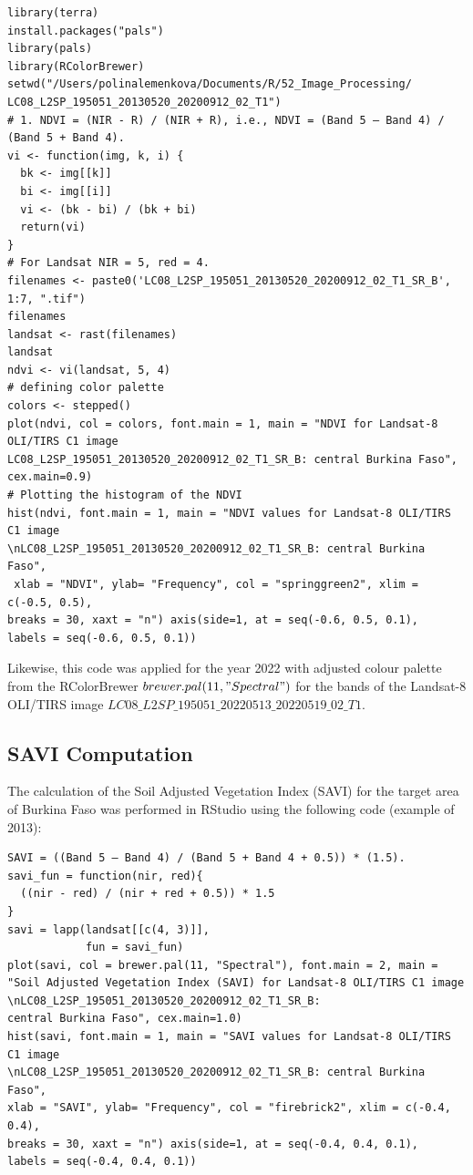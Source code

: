 \documentclass[atmosphere,article,submit,pdftex,moreauthors]{Definitions/mdpi}
\begin{document}
\begin{small}
\begin{verbatim}
library(terra)
install.packages("pals")
library(pals)
library(RColorBrewer)
setwd("/Users/polinalemenkova/Documents/R/52_Image_Processing/
LC08_L2SP_195051_20130520_20200912_02_T1")
# 1. NDVI = (NIR - R) / (NIR + R), i.e., NDVI = (Band 5 – Band 4) / (Band 5 + Band 4).
vi <- function(img, k, i) {
  bk <- img[[k]]
  bi <- img[[i]]
  vi <- (bk - bi) / (bk + bi)
  return(vi)
}
# For Landsat NIR = 5, red = 4.
filenames <- paste0('LC08_L2SP_195051_20130520_20200912_02_T1_SR_B', 1:7, ".tif")
filenames
landsat <- rast(filenames)
landsat
ndvi <- vi(landsat, 5, 4)
# defining color palette
colors <- stepped()
plot(ndvi, col = colors, font.main = 1, main = "NDVI for Landsat-8 OLI/TIRS C1 image 
LC08_L2SP_195051_20130520_20200912_02_T1_SR_B: central Burkina Faso", cex.main=0.9)
# Plotting the histogram of the NDVI
hist(ndvi, font.main = 1, main = "NDVI values for Landsat-8 OLI/TIRS C1 image
\nLC08_L2SP_195051_20130520_20200912_02_T1_SR_B: central Burkina Faso", 
 xlab = "NDVI", ylab= "Frequency", col = "springgreen2", xlim = c(-0.5, 0.5), 
breaks = 30, xaxt = "n") axis(side=1, at = seq(-0.6, 0.5, 0.1), 
labels = seq(-0.6, 0.5, 0.1))
\end{verbatim} 
\end{small}

Likewise, this code was applied for the year 2022 with adjusted colour palette from the RColorBrewer $brewer.pal(11, "Spectral")$ for the bands of the Landsat-8 OLI/TIRS image $LC08\_L2SP\_195051\_20220513\_20220519\_02\_T1$.

 \subsection{SAVI Computation}
The calculation of the Soil Adjusted Vegetation Index (SAVI) for the target area of Burkina Faso was performed in RStudio using the following code (example of 2013): 

\begin{small}
\begin{verbatim}
SAVI = ((Band 5 – Band 4) / (Band 5 + Band 4 + 0.5)) * (1.5).
savi_fun = function(nir, red){
  ((nir - red) / (nir + red + 0.5)) * 1.5
}
savi = lapp(landsat[[c(4, 3)]],
            fun = savi_fun)
plot(savi, col = brewer.pal(11, "Spectral"), font.main = 2, main = 
"Soil Adjusted Vegetation Index (SAVI) for Landsat-8 OLI/TIRS C1 image 
\nLC08_L2SP_195051_20130520_20200912_02_T1_SR_B: 
central Burkina Faso", cex.main=1.0)
hist(savi, font.main = 1, main = "SAVI values for Landsat-8 OLI/TIRS C1 image 
\nLC08_L2SP_195051_20130520_20200912_02_T1_SR_B: central Burkina Faso", 
xlab = "SAVI", ylab= "Frequency", col = "firebrick2", xlim = c(-0.4, 0.4),  
breaks = 30, xaxt = "n") axis(side=1, at = seq(-0.4, 0.4, 0.1), 
labels = seq(-0.4, 0.4, 0.1))
\end{verbatim} 
\end{small}
\end{document}
